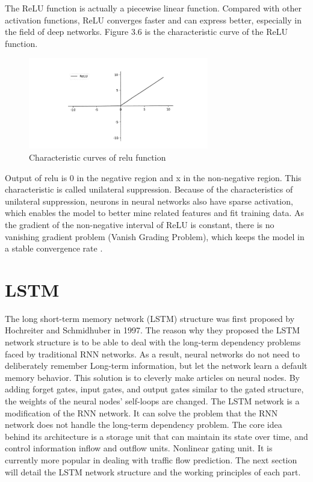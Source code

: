 The ReLU function is actually a piecewise linear function. Compared with other activation functions, ReLU converges faster and can  express better, especially in the field of deep networks. Figure 3.6 is the characteristic curve of the ReLU function.


\begin{figure}[h]
	\centering
	\includegraphics[width=0.7\textwidth]{relu.png}
	\caption{Characteristic curves of relu function}
\end{figure}

 Output of relu is 0 in the negative region and x in the non-negative region. This characteristic is called unilateral suppression. Because of the characteristics of unilateral suppression, neurons in neural networks also have sparse activation, which enables the model to better mine related features and fit training data.
 As the gradient of the non-negative interval of ReLU is constant, there is no vanishing gradient problem (Vanish Grading Problem), which keeps the model in a stable convergence rate .


\section{LSTM}

The long short-term memory network (LSTM) structure was first proposed by Hochreiter and Schmidhuber in 1997.\cite{cheng2016long} The reason why they proposed the LSTM network structure is to be able to deal with the long-term dependency problems faced by traditional RNN networks. As a result, neural networks do not need to deliberately remember Long-term information, but let the network learn a default memory behavior. This solution is to cleverly make articles on neural nodes. By adding forget gates, input gates, and output gates similar to the gated structure, the weights of the neural nodes' self-loops are changed. 
The LSTM network is a modification of the RNN network.\cite{schuster1997bidirectional} It can solve the problem that the RNN network does not handle the long-term dependency problem. The core idea behind its architecture is a storage unit that can maintain its state over time, and control information inflow and outflow units. Nonlinear gating unit. It is currently more popular in dealing with traffic flow prediction. The next section will detail the LSTM network structure and the working principles of each part.

